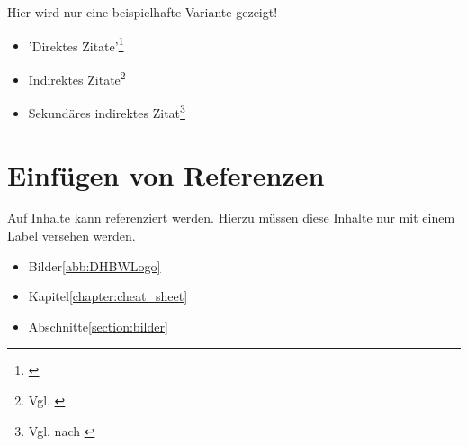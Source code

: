 Hier wird nur eine beispielhafte Variante gezeigt!

    \begin{itemize}
        \item 'Direktes Zitate'\footnote{\cite[S. 114ff.]{Mayring2002}}
        \item Indirektes Zitate\footnote{Vgl. \cite[S. 114ff.]{Mayring2002}}
        \item Sekundäres indirektes Zitat\footnote{Vgl. \cite[S. 114ff.]{Mayring2002} nach \cite{Endres}}
    \end{itemize}

\section{Einfügen von Referenzen}\label{section:referenzen}

Auf Inhalte kann referenziert werden. Hierzu müssen diese Inhalte nur mit einem Label versehen werden.

    \begin{itemize}
        \item Bilder\ref{abb:DHBWLogo}
        \item Kapitel\ref{chapter:cheat_sheet}
        \item Abschnitte\ref{section:bilder}
    \end{itemize}

